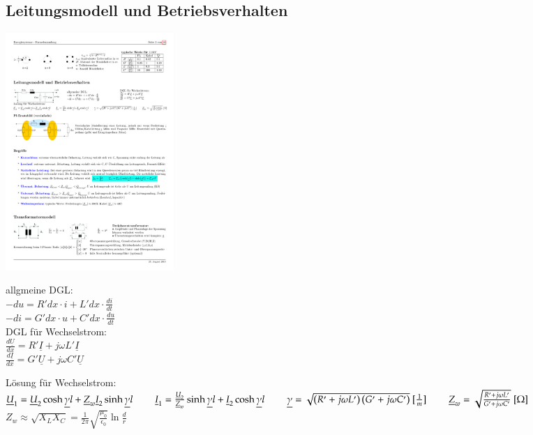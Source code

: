 	\subsection{Leitungsmodell und Betriebsverhalten}
		\begin{multicols}{3}
			\includegraphics[width=0.28\textwidth]{./images/Leitungsmodell1.pdf} 
			
			allgmeine DGL: \\
			$-du = R'dx \cdot i + L'dx \cdot \frac{di}{dt}$\\
			$-di = G'dx \cdot u + C'dx \cdot \frac{du}{dt}$ \\
			
			DGL für Wechselstrom:\\
			$\frac{d\underline{U}}{dx} = R'\underline{I} + j \omega L' \underline{I}$ \\
			$\frac{d\underline{I}}{dx} = G'\underline{U} + j \omega C' \underline{U}$ 
		\end{multicols}
		Lösung für Wechselstrom:\\
		$\underline{U}_1 = \underline{U}_2 \cosh \underline{\gamma}l + \underline{Z}_w \underline{I}_2 \sinh \underline{\gamma}l \hspace{0.8 cm} \underline{I}_1 = \frac{\underline{U}_2}{\underline{Z}_w} \sinh \underline{\gamma}l + \underline{I}_2 \cosh \underline{\gamma}l \hspace{0.8cm} \underline{\gamma} = \sqrt{\left(R' + j \omega L'\right) \left(G' + j \omega C'\right)}~[\frac{1}{m}] \hspace{0.8cm} \underline{Z}_w = \sqrt{\frac{R' + j\omega L'}{G' + j \omega C'}}~[\Omega]$ \\
		$Z_w \approx \sqrt{X_L X_C} = \frac{1}{2\pi} \sqrt{\frac{\mu_0}{\epsilon_0}} \ln \frac{d}{r} \hspace{1cm}$ \\
		
